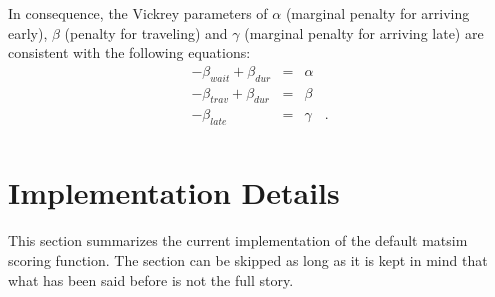 In consequence, the Vickrey parameters of $\alpha$ (marginal penalty for arriving early), $\beta$ (penalty for traveling) and $\gamma$ (marginal penalty for arriving late) \citep[as defined by][]{ArnottEtcBottleneck-inelastic} are consistent with the following equations:
\begin{equation}
\begin{array}{ccrc}
-\beta_{wait} + \beta_{dur} & = & \alpha & \\
-\beta_{trav} + \beta_{dur} & = & \beta & \\
- \beta_{late} & = & \gamma & . \\
\end{array}
\end{equation}


\section{Implementation Details}
\label{sec:scoring-current}
This section summarizes the current implementation of the default \gls{matsim} scoring function. The section can be skipped as long as it is kept in mind that what has been said before is not the full story.

%

